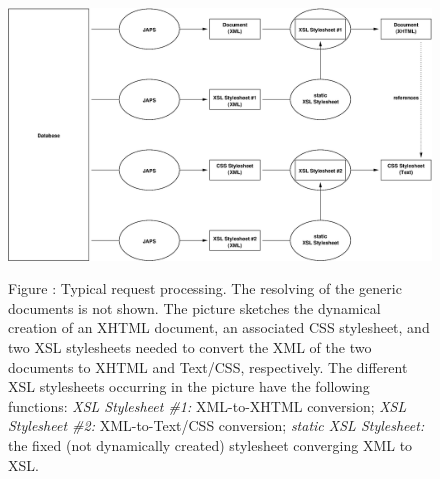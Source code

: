 \documentclass[a4paper,11pt]{article}
\begin{document}
\begin{figure}
  \centering
  \includegraphics[width=15.5cm]{typical_request_processing.eps}

  \vspace{0.5cm}

  \begin{minipage}{13.5cm}
    \small Figure \thefigure:
    Typical request processing. The resolving of the generic documents is not shown. The
    picture sketches the dynamical creation of an XHTML document, an associated CSS
    stylesheet, and two XSL stylesheets needed to convert the XML of the two
    documents to XHTML and Text/CSS, respectively. The different XSL stylesheets occurring
    in the picture have the following functions: \emph{XSL Stylesheet \#1:} XML-to-XHTML
    conversion; \emph{XSL Stylesheet \#2:} XML-to-Text/CSS conversion; \emph{static XSL
    Stylesheet:} the fixed (not dynamically created) stylesheet converging XML to XSL.
  \end{minipage}
\end{figure}
\end{document}
